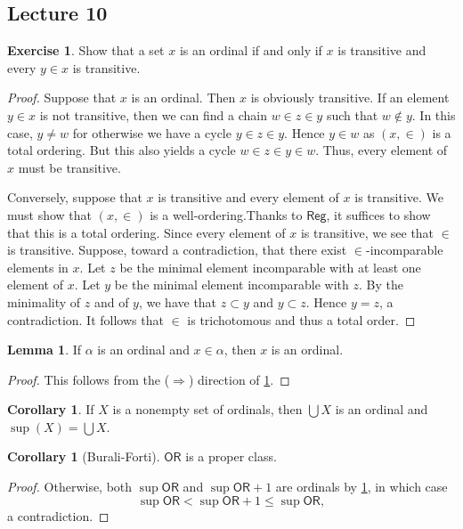 \documentclass[10pt,letterpaper,cm]{nupset}
\theoremstyle{definition}
\theoremstyle{theorem}
\newtheorem{lemma}[definition]{Lemma}
\newtheorem{corollary}[definition]{Corollary}
\newtheorem{exercise}[definition]{Exercise}
\theoremstyle{remark}
\newcommand{\1}{\mathbf{1}}
\newcommand{\0}{\vec 0}
\newcommand{\ord}{\mathsf{OR}}
\begin{document}
\subsection{Lecture 10}\label{Lecture10}


\begin{exercise}\label{ord-char}
Show that a set $x$ is an ordinal if and only if $x$ is transitive and every $y\in x$ is transitive. 
\end{exercise}
\begin{proof}
Suppose that $x$ is an ordinal. Then $x$ is obviously transitive. If an element $y\in x$ is not transitive, then we can find a chain $w \in z \in y$ such that $w\notin y$. In this case, $y\ne w$ for otherwise we have a cycle $y\in z \in y$. Hence $y\in w$ as $\left(x, \in \right)$ is a total ordering. But this also yields a cycle $w\in z \in y \in w$. Thus, every element of $x$ must be transitive.

\medskip

Conversely, suppose that $x$ is transitive and every element of $x$ is transitive. We must show that $\left(x, \in \right)$ is a well-ordering.Thanks to $\mathsf{Reg}$, it suffices to show that this is a total ordering. Since every element of $x$ is transitive, we see that $\in$ is transitive. Suppose, toward a contradiction, that there exist $\in$-incomparable elements in $x$. Let $z$ be the minimal element incomparable with at least one element of $x$. Let $y$ be the minimal element incomparable with $z$. By the minimality of $z$ and of $y$, we have that $z \subset y$ and $y \subset z$. Hence $y =z$, a contradiction. It follows that $\in$ is trichotomous and thus a total order.
\end{proof}

\begin{lemma}
If $\alpha$ is an ordinal and $x\in \alpha$, then $x$ is an ordinal. 
\end{lemma}
\begin{proof}
This follows from the ($\Longrightarrow$) direction of \cref{ord-char}.
\end{proof}

\begin{corollary}\label{LC}
If $X$ is a nonempty set of ordinals, then $\bigcup{X}$ is an ordinal and $\sup(X) = \bigcup{X}$.
\end{corollary}

\begin{corollary}[Burali-Forti]\label{B-F}
$\ord$ is a proper class.
\end{corollary}
\begin{proof}
Otherwise, both $\sup{\ord}$ and $\sup{\ord}+1$ are ordinals by \cref{LC}, in which case $$\sup{\ord} < \sup{\ord} +1 \leq \sup{\ord},$$ a contradiction. 
 \end{proof}
\end{document}
